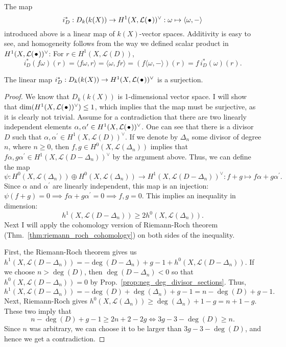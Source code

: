 \documentclass[12pt]{article}
\begin{document}
The map
\[
  i_{D}^{\ast}:D_{k}(k(X))\to H^1(X,\mathcal{L}(\kern.08em\bullet\kern.08em))^{\vee}:\omega\mapsto \langle\omega, -\rangle
\]
introduced above is a linear map of $k(X)$-vector spaces. Additivity is
easy to see, and homogeneity follows from the way we defined scalar product
in $H^1(X,\mathcal{L}(\kern.08em\bullet\kern.08em))^{\vee}$: For $r\in H^{1}(X,\mathcal{L}(D))$,
\[
  i_{D}^{\ast}(f\omega)(r)=\langle f\omega, r\rangle = \langle\omega, fr\rangle
  =\left(f\langle\omega,-\rangle\right)(r)=f\,i_{D}^{\ast}(\omega)(r).
\]
\begin{lemm}
  The linear map $i_{D}^{\ast}:D_{k}(k(X))\to H^1(X,\mathcal{L}(\kern.08em\bullet\kern.08em))^{\vee}$ is a surjection.
\end{lemm}
\begin{proof}
  We know that $D_{k}(k(X))$ is 1-dimensional vector space. I will show
  that $\dim(H^1(X,\mathcal{L}(\kern.08em\bullet\kern.08em))^{\vee})\leq1$, which implies that the map must be surjective,
  as it is clearly not trivial. Assume for a contradiction that there are two
  linearly independent elements $\alpha, \alpha^{\prime}\in H^1(X,\mathcal{L}(\kern.08em\bullet\kern.08em))^{\vee}$. One can
  see that there is a divisor $D$ such that $\alpha, \alpha^{\prime}
  \in H^{1}(X,\mathcal{L}(D))^{\vee}$. If we denote by $\Delta_{n}$ some
  divisor of degree $n$, where $n\geq 0$, then $f,g
  \in H^{0}(X,\mathcal{L}(\Delta_{n}))$ implies that $f\alpha,g\alpha^{\prime}
  \in H^{1}(X,\mathcal{L}(D-\Delta_{n}))^{\vee}$ by the argument above.
  Thus, we can define the map
  \[
    \psi: H^{0}(X,\mathcal{L}(\Delta_{n}))\oplus
    H^{0}(X,\mathcal{L}(\Delta_{n}))\to
    H^{1}(X,\mathcal{L}(D-\Delta_{n}))^{\vee}:f+g\mapsto
    f\alpha+g\alpha^{\prime}.
  \]
  Since $\alpha$ and $\alpha^{\prime}$ are linearly independent, this
  map is an injection: $\psi(f+g)=0\implies f\alpha+g\alpha^{\prime}=0
  \implies f,g=0$. This implies an inequality in dimension:
  \[h^{1}(X,\mathcal{L}(D-\Delta_{n}))\geq 2h^{0}(X,\mathcal{L}(\Delta_{n})).\]
  Next I will apply the cohomology version of Riemann-Roch theorem
  (Thm.~\ref{thm:riemann_roch_cohomology}) on both sides of the inequality.

  First, the Riemann-Roch theorem gives us
  $h^{1}(X,\mathcal{L}(D-\Delta_{n}))=-\deg(D-\Delta_{n})+g-1
  +h^{0}(X,\mathcal{L}(D-\Delta_{n}))$. If we choose $n>\deg(D)$, then
  $\deg(D-\Delta_{n})<0$ so that $h^{0}(X,\mathcal{L}(D-\Delta_{n}))=0$
  by Prop.~\ref{prop:neg_deg_divisor_sections}. Thus,
  \[
    h^{1}(X,\mathcal{L}(D-\Delta_{n}))=-\deg(D)+\deg(\Delta_{n})+g-1=n-\deg(D)
    +g-1.
  \]
  Next, Riemann-Roch gives $h^{0}(X,\mathcal{L}(\Delta_{n}))\geq
  \deg(\Delta_{n})+1-g=n+1-g$.
  These two imply that
  \[
    n-\deg(D)+g-1\geq 2n+2-2g\iff 3g-3-\deg(D)\geq n.
  \]
  Since $n$ was arbitrary, we can choose it to be larger than $3g-3-\deg(D)$,
  and hence we get a contradiction.
\end{proof}
\end{document}
